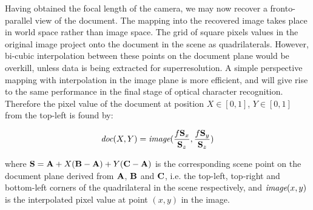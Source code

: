 Having obtained the focal length of the camera, we may now recover a fronto-parallel view of the document.  The mapping into the recovered image takes place in world space rather than image space.
The grid of square pixels values in the original image project onto the document in the scene as quadrilaterals.
However, bi-cubic interpolation between these points on the document plane would be overkill,
unless data is being extracted for superresolution.
A simple perspective mapping with interpolation in the image plane is more efficient, and
will give rise to the same performance in the final stage of optical character recognition.
Therefore the pixel value of the document at position $X \in [0,1]$, $Y \in [0,1]$ from the top-left is found by:

\begin{equation}
\mbox{\em doc}(X,Y) = \mbox{\em image}(\frac{f{ \bf S }_x}{{ \bf S }_z},\frac{f{ \bf S }_y}{{ \bf S }_z})
\end{equation}


where
${ \bf S } = { \bf A } + X ( { \bf B }-{ \bf A } ) + Y ( { \bf C }-{ \bf A } )$
is the corresponding scene point on the document plane
derived from ${ \bf A }$, ${ \bf B }$ and ${ \bf C }$, i.e. the top-left, top-right and bottom-left corners of the
quadrilateral in the scene 
respectively, and $\mbox{\em image}(x,y)$ is the interpolated pixel value at point $(x,y)$ in the image.

